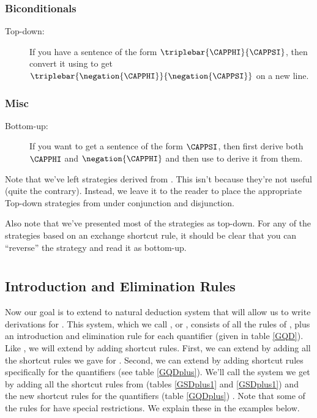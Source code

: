 \subsubsection*{Biconditionals} 
\begin{description}
\item[ Top-down:] If you have a sentence of the form $\triplebar{\CAPPHI}{\CAPPSI}$, then convert it using  to get $\triplebar{\negation{\CAPPHI}}{\negation{\CAPPSI}}$ on a new line.
\end{description} 
\subsubsection*{Misc} 
\begin{description}
\item[ Bottom-up:] If you want to get a sentence of the form $\CAPPSI$, then first derive both $\CAPPHI$ and $\negation{\CAPPHI}$ and then use  to derive it from them. 
\end{description} 
\noindent{}Note that we've left strategies derived from . 
This isn't because they're not useful (quite the contrary). 
Instead, we leave it to the reader to place the appropriate Top-down strategies from  under conjunction and disjunction. 

Also note that we've presented most of the strategies as top-down. 
For any of the strategies based on an exchange shortcut rule, it should be clear that you can ``reverse'' the strategy and read it as bottom-up. 

\section{\GQD{}}\label{Section GQD}

\subsection{Introduction and Elimination Rules}

Now our goal is to extend \GSD{} to  natural deduction system that will allow us to write derivations for \GQL{}. 
This system, which we call , or \GQD{}, consists of all the rules of \GSD{}, plus an introduction and elimination rule for each quantifier (given in table \ref{GQD}). 
Like \GSD{}, we will extend \GQD{} by adding shortcut rules. 
First, we can extend \GQD{} by adding all the shortcut rules we gave for \GSD{}. 
Second, we can extend \GQD{} by adding shortcut rules specifically for the quantifiers (see table \ref{GQDplus}).
We'll call the system we get by adding all the shortcut rules from \GSD{} (tables \ref{GSDplus1} and \ref{GSDplus1}) and the new shortcut rules for the quantifiers (table \ref{GQDplus}) \GQDP{}.
Note that some of the rules for \GQD{} have special restrictions.
We explain these in the examples below. 

